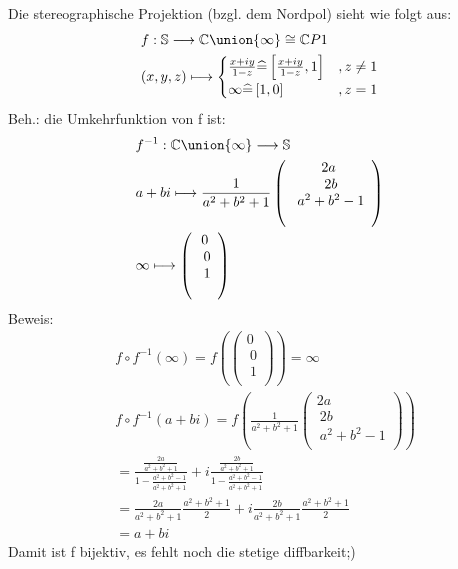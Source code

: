 \section{}
	Die stereographische Projektion (bzgl. dem Nordpol) sieht wie folgt aus:
	\begin{align}
		&f:\mathbb{S}\longrightarrow \mathbb{C} \union \{ \infty \}\cong\mathbb{C}P1\\
		&(x,y,z)\longmapsto 
		\begin{cases}
            \frac{x+iy}{1-z} \widehat{=}\left[\frac{x+iy}{1-z},1\right] &,z \neq 1\\
            \infty \widehat{=}\left[1,0\right]	&,z = 1
        \end{cases}
	\end{align}
	Beh.: die Umkehrfunktion von f ist:
	\begin{align}
		&f^{-1}: \mathbb{C} \union \{ \infty \}\longrightarrow \mathbb{S}\\
		&a+bi \longmapsto \frac{1}{a^2+b^2+1}\left( \begin{array}{c} 2a \\\ 2b \\\ a^2+b^2-1 \\\ \end{array}\right)\\
		&\infty \longmapsto \left( \begin{array}{c} 0 \\\ 0 \\\ 1 \\\ \end{array}\right)
	\end{align}
	Beweis:
	\begin{align}
		&f \circ f^{-1}(\infty) = f(\left( \begin{array}{c} 0 \\\ 0 \\\ 1 \\\ \end{array}\right))=\infty \\
		&f \circ f^{-1}(a+bi)=f(\frac{1}{a^2+b^2+1}\left( \begin{array}{c} 2a \\\ 2b \\\ a^2+b^2-1 \\\ \end{array}\right) )\\
		&=\frac{\frac{2a}{a^2+b^2+1}}{1-\frac{a^2+b^2-1}{a^2+b^2+1}}+i\frac{\frac{2b}{a^2+b^2+1}}{1-\frac{a^2+b^2-1}{a^2+b^2+1}}\\
		&=\frac{2a}{a^2+b^2+1}\frac{a^2+b^2+1}{2}+i\frac{2b}{a^2+b^2+1}\frac{a^2+b^2+1}{2}\\
		&=a+bi
	\end{align}
	Damit ist f bijektiv, es fehlt noch die stetige diffbarkeit;)